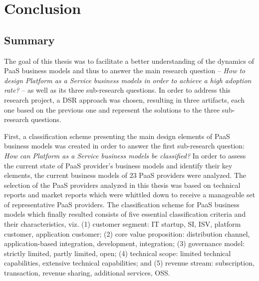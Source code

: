 \chapter{Conclusion}\label{ch:dc}

	\section{Summary}\label{ch:dc:s}

	The goal of this thesis was to facilitate a better understanding of the dynamics of \acf{PaaS} business models and thus to answer the main research question -- \textit{How to design Platform as a Service business models in order to achieve a high adoption rate?} -- as well as its three sub-research questions. In order to address this research project, a \acf{DSR} approach was chosen, resulting in three artifacts, each one based on the previous one and represent the solutions to the three sub-research questions. 
	
	First, a classification scheme presenting the main design elements of \ac{PaaS} business models was created in order to answer the first sub-research question: \textit{How can Platform as a Service business models be classified?} In order to assess the current state of \ac{PaaS} provider's business models and identify their key elements, the current business models of 23 \ac{PaaS} providers were analyzed. The selection of the \ac{PaaS} providers analyzed in this thesis was based on technical reports and market reports which were whittled down to receive a manageable set of representative \ac{PaaS} providers. The classification scheme for \ac{PaaS} business models which finally resulted consists of five essential classification criteria and their characteristics, viz. (1) customer segment: \ac{IT} startup, \acf{SI}, \acf{ISV}, platform customer, application customer; (2) core value proposition: distribution channel, application-based integration, development, integration; (3) governance model: strictly limited, partly limited, open; (4) technical scope: limited technical capabilities, extensive technical capabilities; and (5) revenue stream: subscription, transaction, revenue sharing, additional services, \acf{OSS}.
	

